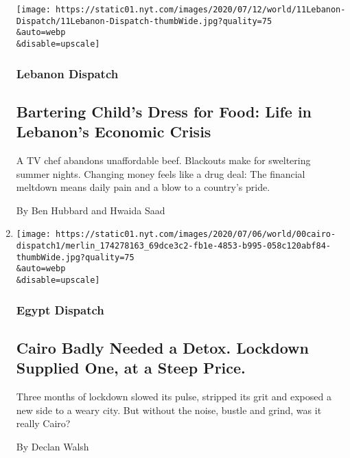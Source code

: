 \begin{enumerate}
  \texttt{[image: https://static01.nyt.com/images/2020/07/12/world/11Lebanon-Dispatch/11Lebanon-Dispatch-thumbWide.jpg?quality=75\\\&auto=webp\\\&disable=upscale]}

  \hypertarget{lebanon-dispatch}{%
  \subsubsection{Lebanon Dispatch}\label{lebanon-dispatch}}

  \hypertarget{bartering-childs-dress-for-food-life-in-lebanons-economic-crisis}{%
  \subsection{Bartering Child's Dress for Food: Life in Lebanon's
  Economic
  Crisis}\label{bartering-childs-dress-for-food-life-in-lebanons-economic-crisis}}

  A TV chef abandons unaffordable beef. Blackouts make for sweltering
  summer nights. Changing money feels like a drug deal: The financial
  meltdown means daily pain and a blow to a country's pride.

  By Ben Hubbard and Hwaida Saad
\item
  \href{/2020/07/09/world/middleeast/cairo-lockdown-detox.html}{}

  \texttt{[image: https://static01.nyt.com/images/2020/07/06/world/00cairo-dispatch1/merlin\_174278163\_69dce3c2-fb1e-4853-b995-058c120abf84-thumbWide.jpg?quality=75\\\&auto=webp\\\&disable=upscale]}

  \hypertarget{egypt-dispatch}{%
  \subsubsection{Egypt Dispatch}\label{egypt-dispatch}}

  \hypertarget{cairo-badly-needed-a-detox-lockdown-supplied-one-at-a-steep-price}{%
  \subsection{Cairo Badly Needed a Detox. Lockdown Supplied One, at a
  Steep
  Price.}\label{cairo-badly-needed-a-detox-lockdown-supplied-one-at-a-steep-price}}

  Three months of lockdown slowed its pulse, stripped its grit and
  exposed a new side to a weary city. But without the noise, bustle and
  grind, was it really Cairo?

  By Declan Walsh
\end{enumerate}

